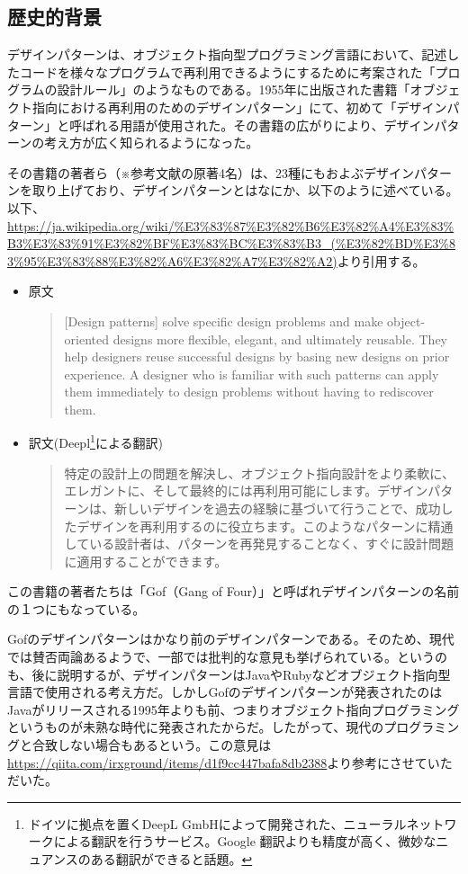\documentclass[dvipdfmx]{jsarticle}
\begin{document}
\subsection{歴史的背景}
デザインパターンは、オブジェクト指向型プログラミング言語において、記述したコードを様々なプログラムで再利用できるようにするために考案された「プログラムの設計ルール」のようなものである。1955年に出版された書籍「オブジェクト指向における再利用のためのデザインパターン\cite{book01}」にて、初めて「デザインパターン」と呼ばれる用語が使用された。その書籍の広がりにより、デザインパターンの考え方が広く知られるようになった。\par
その書籍の著者ら（※参考文献の原著4名）は、23種にもおよぶデザインパターンを取り上げており、デザインパターンとはなにか、以下のように述べている。以下、\url{https://ja.wikipedia.org/wiki/%E3%83%87%E3%82%B6%E3%82%A4%E3%83%B3%E3%83%91%E3%82%BF%E3%83%BC%E3%83%B3_(%E3%82%BD%E3%83%95%E3%83%88%E3%82%A6%E3%82%A7%E3%82%A2)}より引用する。
\begin{itemize}
  \item 原文
  \begin{quote}
    [Design patterns] solve specific design problems and make object-oriented designs more flexible, elegant, and ultimately reusable. They help designers reuse successful designs by basing new designs on prior experience. A designer who is familiar with such patterns can apply them immediately to design problems without having to rediscover them.
  \end{quote}
  \item 訳文(Deepl\footnote{ドイツに拠点を置くDeepL GmbHによって開発された、ニューラルネットワークによる翻訳を行うサービス。Google 翻訳よりも精度が高く、微妙なニュアンスのある翻訳ができると話題。}による翻訳)
  \begin{quote}
    特定の設計上の問題を解決し、オブジェクト指向設計をより柔軟に、エレガントに、そして最終的には再利用可能にします。デザインパターンは、新しいデザインを過去の経験に基づいて行うことで、成功したデザインを再利用するのに役立ちます。このようなパターンに精通している設計者は、パターンを再発見することなく、すぐに設計問題に適用することができます。
  \end{quote}
\end{itemize}
この書籍の著者たちは「Gof（Gang of Four）」と呼ばれデザインパターンの名前の１つにもなっている。\par
Gofのデザインパターンはかなり前のデザインパターンである。そのため、現代では賛否両論あるようで、一部では批判的な意見も挙げられている。というのも、後に説明するが、デザインパターンはJavaやRubyなどオブジェクト指向型言語で使用される考え方だ。しかしGofのデザインパターンが発表されたのはJavaがリリースされる1995年よりも前、つまりオブジェクト指向プログラミングというものが未熟な時代に発表されたからだ。したがって、現代のプログラミングと合致しない場合もあるという。この意見は\url{https://qiita.com/irxground/items/d1f9cc447bafa8db2388}より参考にさせていただいた。
\end{document}
